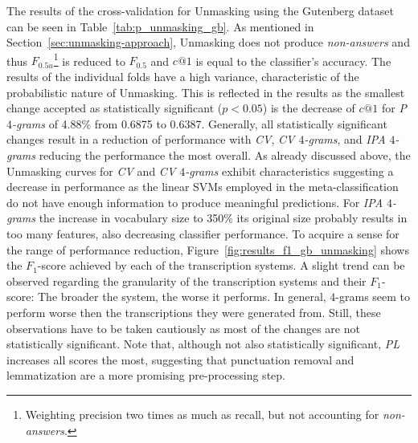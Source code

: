 The results of the cross-validation for Unmasking using the Gutenberg dataset can be seen in Table~\ref{tab:p_unmasking_gb}.
As mentioned in Section~\ref{sec:unmasking-approach}, Unmasking does not produce \textit{non-answers} and thus $F_{0.5u}$\footnote{Weighting precision two times as much as recall, but not accounting for \textit{non-answers}.} is reduced to $F_{0.5}$ and $c@1$ is equal to the classifier's accuracy.
The results of the individual folds have a high variance, characteristic of the probabilistic nature of Unmasking.
This is reflected in the results as the smallest change accepted as statistically significant ($p<0.05$) is the decrease of $c@1$ for \textit{P $4$-grams} of 4.88\% from 0.6875 to 0.6387.
Generally, all statistically significant changes result in a reduction of performance with \textit{CV}, \textit{CV $4$-grams}, and \textit{IPA $4$-grams} reducing the performance the most overall.
As already discussed above, the Unmasking curves for \textit{CV} and \textit{CV $4$-grams} exhibit characteristics suggesting a decrease in performance as the linear SVMs employed in the meta-classification do not have enough information to produce meaningful predictions.
For \textit{IPA $4$-grams} the increase in vocabulary size to 350\% its original size probably results in too many features, also decreasing classifier performance.
To acquire a sense for the range of performance reduction, Figure~\ref{fig:results_f1_gb_unmasking} shows the $F_1$-score achieved by each of the transcription systems.
A slight trend can be observed regarding the granularity of the transcription systems and their $F_1$-score:
The broader the system, the worse it performs.
In general, $4$-grams seem to perform worse then the transcriptions they were generated from.
Still, these observations have to be taken cautiously as most of the changes are not statistically significant.
Note that, although not also statistically significant, \textit{PL} increases all scores the most, suggesting that punctuation removal and lemmatization are a more promising pre-processing step.\newline

